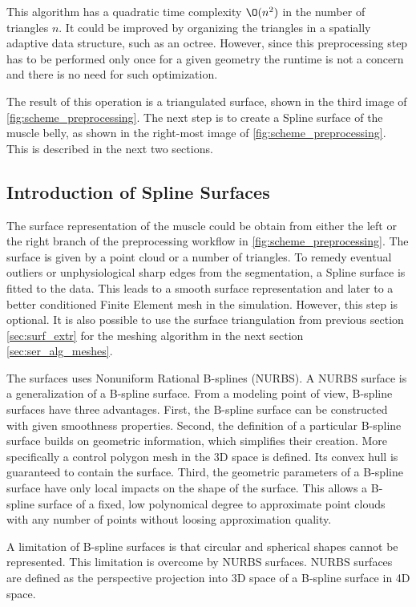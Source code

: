 This algorithm has a quadratic time complexity $\O(n^2)$ in the number of triangles $n$. It could be improved by organizing the triangles in a spatially adaptive data structure, such as an octree. However, since this preprocessing step has to be performed only once for a given geometry the runtime is not a concern and there is no need for such optimization.

The result of this operation is a triangulated surface, shown in the third image of \cref{fig:scheme_preprocessing}. The next step is to create a Spline surface of the muscle belly, as shown in the right-most image of \cref{fig:scheme_preprocessing}. This is described in the next two sections.

\subsection{Introduction of Spline Surfaces}\label{sec:nurbs}
The surface representation of the muscle could be obtain from either the left or the right branch of the preprocessing workflow in \cref{fig:scheme_preprocessing}. The surface is given by a point cloud or a number of triangles. To remedy eventual outliers or unphysiological sharp edges from the segmentation, a Spline surface is fitted to the data. This leads to a smooth surface representation and later to a better conditioned Finite Element mesh in the simulation. However, this step is optional. It is also possible to use the surface triangulation from previous section \ref{sec:surf_extr} for the meshing algorithm in the next section \ref{sec:ser_alg_meshes}.

The surfaces uses Nonuniform Rational B-splines (NURBS). A NURBS surface is a generalization of a B-spline surface. From a modeling point of view, B-spline surfaces have three advantages. First, the B-spline surface can be constructed with given smoothness properties.  Second, the definition of a particular B-spline surface builds on geometric information, which simplifies their creation. More specifically a control polygon mesh in the 3D space is defined. Its convex hull is guaranteed to contain the surface. Third, the geometric parameters of a B-spline surface have only local impacts on the shape of the surface. This allows a B-spline surface of a fixed, low polynomical degree to approximate point clouds with any number of points without loosing approximation quality.

A limitation of B-spline surfaces is that circular and spherical shapes cannot be represented. This limitation is overcome by NURBS surfaces. NURBS surfaces are defined as the perspective projection into 3D space of a B-spline surface in 4D space.


